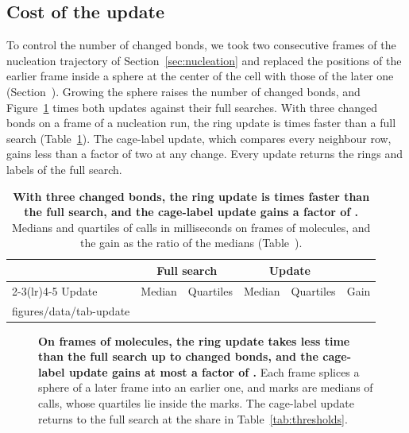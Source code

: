 \documentclass[preprint,12pt]{elsarticle}
\makeatletter
\newcommand{\tabbody}[1]{\@@input #1 }
\makeatother
\begin{document}
\subsection{Cost of the update}
\label{sec:churn}

To control the number of changed bonds, we took two consecutive frames of the nucleation trajectory of Section~\ref{sec:nucleation} and replaced the positions of the earlier frame inside a sphere at the center of the cell with those of the later one (Section~).
Growing the sphere raises the number of changed bonds, and Figure~\ref{fig:churn} times both updates against their full searches.
With three changed bonds on a frame of a nucleation run, the ring update is  times faster than a full search (Table~\ref{tab:update}).
The cage-label update, which compares every neighbour row, gains less than a factor of two at any change.
Every update returns the rings and labels of the full search.

\begin{table}[tbp]
\centering
\caption{\textbf{With three changed bonds, the ring update is  times faster than the full search, and the cage-label update gains a factor of .}
Medians and quartiles of  calls in milliseconds on frames of  molecules, and the gain as the ratio of the medians (Table~).}
\label{tab:update}
\small
\setlength{\tabcolsep}{4pt}
\begin{tabular}{@{}lrrrrr@{}}
\toprule
 & \multicolumn{2}{c}{Full search} & \multicolumn{2}{c}{Update} & \\
\cmidrule(lr){2-3}\cmidrule(lr){4-5}
Update & Median & Quartiles & Median & Quartiles & Gain \\
\midrule
\tabbody{figures/data/tab-update}
\bottomrule
\end{tabular}
\end{table}

\begin{figure}[tbp]
\centering

\caption{\textbf{On frames of  molecules, the ring update takes less time than the full search up to  changed bonds, and the cage-label update gains at most a factor of .}
Each frame splices a sphere of a later frame into an earlier one, and marks are medians of  calls, whose quartiles lie inside the marks.
The cage-label update returns to the full search at the share in Table~\ref{tab:thresholds}.}
\label{fig:churn}
\end{figure}
\end{document}

